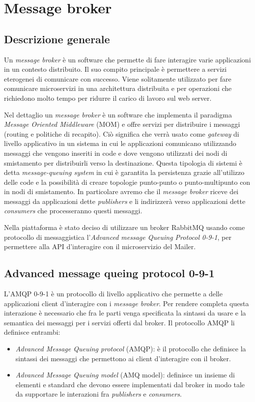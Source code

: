 \section{Message broker}
\subsection{Descrizione generale}
Un \textit{message broker} è un software che permette di fare interagire varie applicazioni in
un contesto distribuito. Il suo compito principale è permettere a servizi eterogenei di comunicare con successo.
Viene solitamente utilizzato per fare comunicare microservizi in una architettura distribuita
e per operazioni che richiedono molto tempo per ridurre il carico di lavoro sul web server.

Nel dettaglio un \textit{message broker} è un software che implementa il paradigma \textit{Message Oriented Middleware} (MOM) e offre servizi per distribuire i messaggi (routing e politiche di recapito).
Ciò significa che verrà usato come \textit{gateway} di livello applicativo in un sistema in cui le applicazioni comunicano utilizzando messaggi
che vengono inseriti in code e dove vengono utilizzati dei nodi di smistamento per distribuirli verso la destinazione.
Questa tipologia di sistemi è detta \textit{message-queuing system}\cite{MessageBroker-Book} in cui è garantita la persistenza
grazie all'utilizzo delle code e la possibilità di creare topologie punto-punto o punto-multipunto con in nodi di smistamento.
In particolare avremo che il \textit{message broker} riceve dei messaggi da applicazioni dette \textit{publishers} e li indirizzerà verso applicazioni dette \textit{consumers} che processeranno questi messaggi.

Nella piattaforma è stato deciso di utilizzare un broker RabbitMQ\cite{rabbitMQ} usando come protocollo di messaggistica l'\textit{Advanced message Queuing Protocol 0-9-1}\cite{amqp},
per permettere alla API d'interagire con il microservizio del Mailer.

\subsection{Advanced message queing protocol 0-9-1}
L'AMQP 0-9-1 è un protocollo di livello applicativo che permette a delle applicazioni client d'interagire con i \textit{message broker}.
Per rendere completa questa interazione è necessario che fra le parti venga specificata la sintassi da usare e la semantica dei messaggi per i servizi offerti dal broker.
Il protocollo AMQP li definisce entrambi:
\begin{itemize}
    \item \textit{Advanced Message Queuing protocol} (AMQP): è il protocollo che definisce la sintassi dei messaggi che permettono ai client d'interagire con il broker.
    \item \textit{Advanced Message Queuing model} (AMQ model): definisce un insieme di elementi e standard che devono essere implementati dal broker in modo tale da supportare le interazioni fra \textit{publishers} e \textit{consumers}.
\end{itemize}

